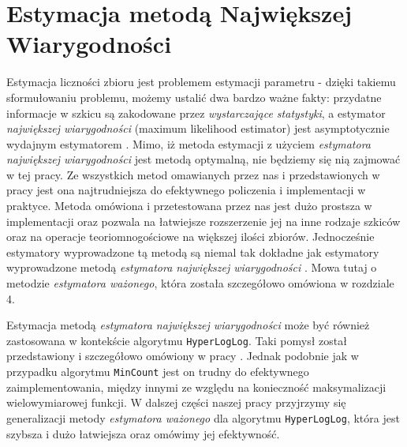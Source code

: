 \section{Estymacja metodą Największej Wiarygodności}

Estymacja liczności zbioru jest problemem estymacji parametru - dzięki takiemu sformułowaniu problemu, możemy ustalić dwa bardzo ważne fakty: przydatne informacje w szkicu są zakodowane przez \textit{wystarczające statystyki}, a estymator \textit{największej wiarygodności} (maximum likelihood estimator) jest asymptotycznie wydajnym estymatorem \cite{ting}. Mimo, iż metoda estymacji z użyciem \textit{estymatora największej wiarygodności} jest metodą optymalną, nie będziemy się nią zajmować w tej pracy. Ze wszystkich metod omawianych przez nas i przedstawionych w pracy \cite{ting} jest ona najtrudniejsza do efektywnego policzenia i implementacji w praktyce. Metoda omówiona i przetestowana przez nas jest dużo prostsza w implementacji oraz pozwala na łatwiejsze rozszerzenie jej na inne rodzaje szkiców oraz na operacje teoriomnogościowe na większej ilości zbiorów. Jednocześnie estymatory wyprowadzone tą metodą są niemal tak dokładne jak estymatory wyprowadzone metodą \textit{estymatora największej wiarygodności} \cite{ting}. Mowa tutaj o metodzie \textit{estymatora ważonego}, która została szczegółowo omówiona w rozdziale 4.

Estymacja metodą \textit{estymatora największej wiarygodności} może być również zastosowana w kontekście algorytmu \texttt{HyperLogLog}. Taki pomysł został przedstawiony i szczegółowo omówiony w pracy \cite{oertl}. Jednak podobnie jak w przypadku algorytmu \texttt{MinCount} jest on trudny do efektywnego zaimplementowania, między innymi ze względu na konieczność maksymalizacji wielowymiarowej funkcji. W dalszej części naszej pracy przyjrzymy się generalizacji metody \textit{estymatora ważonego} dla algorytmu \texttt{HyperLogLog}, która jest szybsza i dużo łatwiejsza oraz omówimy jej efektywność.